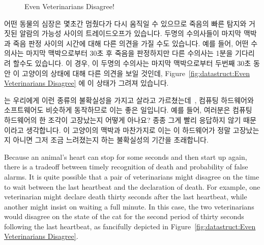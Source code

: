 \fi

\begin{figure}[tb]
\centering
{}
\caption{Even Veterinarians Disagree!}
\end{figure}

어떤 동물의 심장은 몇초간 멈췄다가 다시 움직일 수 있으므로 죽음의 빠른 탐지와
거짓된 알람의 가능성 사이의 트레이드오프가 있습니다.
두명의 수의사들이 마지막 맥박과 죽음 판정 사이의 시간에 대해 다른 의견을 가질
수도 있습니다.
예를 들어, 어떤 수의사는 마지막 맥박으로부터 30초 후 죽음을 판정하지만 다른
수의사는 1분을 기다리려 할수도 있습니다.
이 경우, 이 두명의 수의사는 마지막 맥박으로부터 두번째 30초 동안 이 고양이의
상태에 대해 다른 의견을 보일 것인데,
Figure~\ref{fig:datastruct:Even Veterinarians Disagree} 에 이 상태가 그려져
있습니다.

 는 우리에게 이런 종류의 불확실성을 가지고 살라고
가르쳤는데~\cite{WeinerHeisenberg1927Uncertain}, 컴퓨팅 하드웨어와 소프트웨어도
비슷하게 동작하므로 이는 좋은 일입니다.
예를 들어, 여러분은 컴퓨팅 하드웨어의 한 조각이 고장났는지 어떻게 아나요?
종종 그게 빨리 응답하지 않기 때문이라고 생각합니다.
이 고양이의 맥박과 마찬가지로 이는 이 하드웨어가 정말 고장났는지 아니면 그저
조금 느려졌는지 하는 불확실성의 기간을 초래합니다.

\iffalse

Because an animal's heart can stop for some seconds and then start up
again, there is a tradeoff between timely recognition of death and
probability of false alarms.
It is quite possible that a pair of veterinarians might disagree on
the time to wait between the last heartbeat and the declaration of
death.
For example, one veterinarian might declare death thirty seconds after
the last heartbeat, while another might insist on waiting a full
minute.
In this case, the two veterinarians would disagree on the state of the
cat for the second period of thirty seconds following the last heartbeat,
as fancifully depicted in
Figure~\ref{fig:datastruct:Even Veterinarians Disagree}.

